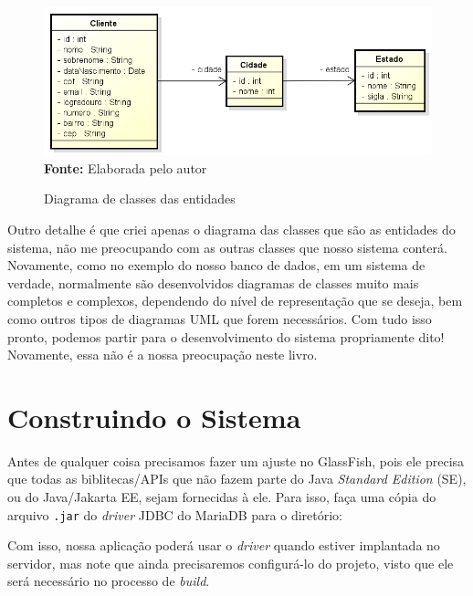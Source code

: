 \FloatBarrier
\begin{figure}[!htbp]
    \centering
    \caption{Diagrama de classes das entidades}
    \includegraphics[scale=0.6]{imagens/cap05DiagramaClasses}
    \\\textbf{Fonte:} Elaborada pelo autor
    \label{fig:cap05DiagramaClasses}
\end{figure}
\FloatBarrier

Outro detalhe é que criei apenas o diagrama das classes que são as entidades do sistema, não me preocupando com as outras classes que nosso sistema conterá. Novamente, como no exemplo do nosso banco de dados, em um sistema de verdade, normalmente são desenvolvidos diagramas de classes muito mais completos e complexos, dependendo do nível de representação que se deseja, bem como outros tipos de diagramas UML que forem necessários. Com tudo isso pronto, podemos partir para o desenvolvimento do sistema propriamente dito! Novamente, essa não é a nossa preocupação neste livro.


\section{Construindo o Sistema}

Antes de qualquer coisa precisamos fazer um ajuste no GlassFish, pois ele precisa que todas as biblitecas/APIs que não fazem parte do Java \textit{Standard Edition} (SE), ou do Java/Jakarta EE, sejam fornecidas à ele. Para isso, faça uma cópia do arquivo \texttt{.jar} do \textit{driver} JDBC do MariaDB para o diretório:


Com isso, nossa aplicação poderá usar o \textit{driver} quando estiver implantada no servidor, mas note que ainda precisaremos configurá-lo do projeto, visto que ele será necessário no processo de \textit{build}.

